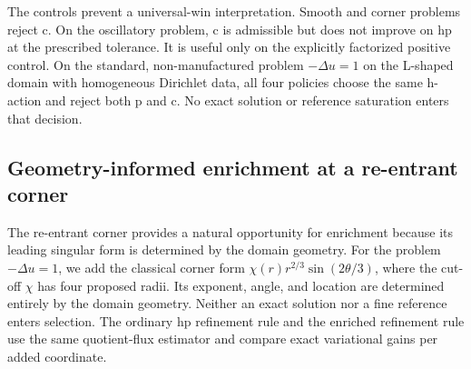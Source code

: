 \documentclass[11pt]{article}
\numberwithin{algorithm}{section}
\theoremstyle{definition}\newtheorem{definition}[theorem]{Definition}
\theoremstyle{remark}\newtheorem{remark}[theorem]{Remark}
\begin{document}
\begin{table}[h]
\centering
\caption{Terminal refinement histories for Poisson problems on the L-shaped
domain.  The first four problems use prescribed exact weak solutions with,
respectively, smooth, corner-singular, oscillatory, and recursively structured
behavior; the final row solves $-\Delta u=1$ with homogeneous Dirichlet data.
Cost counts free scalar coordinates and recorded c-factor evaluations.}
\end{table}

The controls prevent a universal-win interpretation.  Smooth and corner
problems reject c.  On the oscillatory problem, c is admissible but does not
improve on hp at the prescribed tolerance.  It is useful only on the explicitly
factorized positive control.  On the standard, non-manufactured problem
$-\Delta u=1$ on the L-shaped domain with homogeneous Dirichlet data, all four
policies choose the same h-action and reject both p and c.  No exact solution
or reference saturation enters that decision.

\subsection{Geometry-informed enrichment at a re-entrant corner}
The re-entrant corner provides a natural opportunity for enrichment because
its leading singular form is determined by the domain geometry.  For the
problem $-\Delta u=1$, we add the classical corner form
$\chi(r)r^{2/3}\sin(2\theta/3)$, where the cut-off $\chi$ has four proposed
radii.  Its exponent, angle, and location are determined entirely by the
domain geometry.  Neither an exact solution nor a fine reference enters
selection.  The ordinary hp refinement rule and the enriched refinement rule use the
same quotient-flux estimator and compare exact variational gains per added
coordinate.
\end{document}

